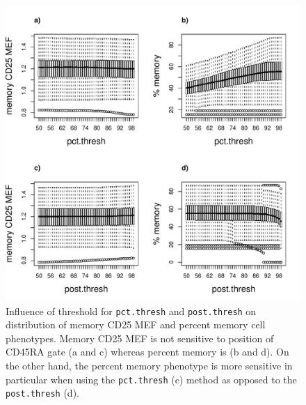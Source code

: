 \begin{figure}[h]
  \includegraphics[width=\textwidth]{figures/cd45raneg-memory-gate-phenotype-sensitivity.pdf}
{ Influence of threshold for \texttt{pct.thresh} and \texttt{post.thresh} on distribution of memory CD25 MEF and percent memory cell phenotypes. }
{
  Memory CD25 MEF is not sensitive to position of CD45RA gate (a and c) whereas percent memory is (b and d).
  On the other hand, the percent memory phenotype is more sensitive in particular when using the \texttt{pct.thresh} (c)
  method as opposed to the \texttt{post.thresh} (d).
}
\end{figure}

